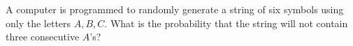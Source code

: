 A computer is programmed to randomly generate a string of six symbols using
only the letters $A, B, C$. What is the probability that the string will not
contain three consecutive $A$'s?
